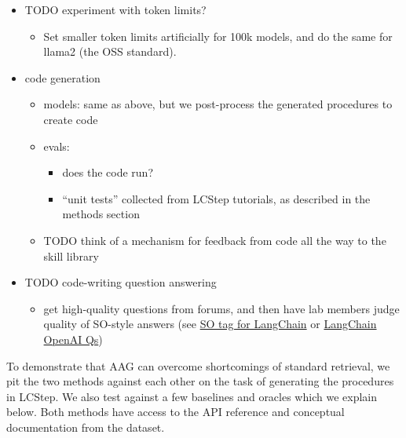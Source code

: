 \documentclass{article}
\begin{document}
\begin{itemize}
\begin{itemize}
                  \begin{itemize}
                     \item How do we draw the line between using RAG and fine-tuning, based on the size and label types and publicness of the dataset?
                  \end{itemize}
         \end{itemize}
   \item TODO experiment with token limits?
         \begin{itemize}
            \item Set smaller token limits artificially for 100k models, and do the same for llama2 (the OSS standard).
         \end{itemize}
   \item code generation
         \begin{itemize}
            \item models: same as above, but we post-process the generated procedures to create code
            \item evals:
                  \begin{itemize}
                     \item does the code run?
                     \item ``unit tests'' collected from LCStep tutorials, as described in the methods section
                  \end{itemize}
            \item TODO think of a mechanism for feedback from code all the way to the skill library
         \end{itemize}
   \item TODO code-writing question answering
         \begin{itemize}
            \item get high-quality questions from forums, and then have lab members judge quality of SO-style answers (see \href{https://stackoverflow.com/questions/tagged/langchain}{SO tag for LangChain} or \href{https://community.openai.com/tag/langchain}{LangChain OpenAI Qs})
         \end{itemize}
\end{itemize}

To demonstrate that AAG can overcome shortcomings of standard retrieval, we pit the two methods against each other on the task of generating the procedures in LCStep. We also test against a few baselines and oracles which we explain below.  Both methods have access to the API reference and conceptual documentation from the dataset.
\end{document}
